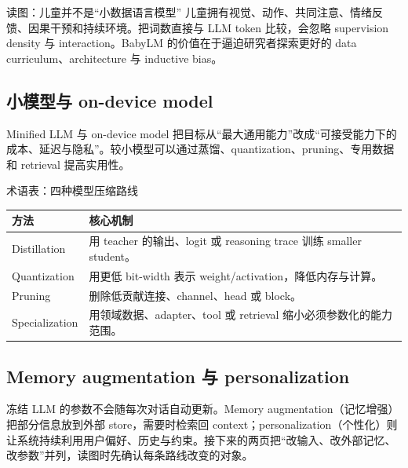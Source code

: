 
\begin{knowledgebox}{读图：儿童并不是“小数据语言模型”}
儿童拥有视觉、动作、共同注意、情绪反馈、因果干预和持续环境。把词数直接与 LLM token 比较，会忽略 supervision density 与 interaction。BabyLM 的价值在于逼迫研究者探索更好的 data curriculum、architecture 与 inductive bias。
\end{knowledgebox}


\subsection{小模型与 on-device model}

Minified LLM 与 on-device model 把目标从“最大通用能力”改成“可接受能力下的成本、延迟与隐私”。较小模型可以通过蒸馏、quantization、pruning、专用数据和 retrieval 提高实用性。


\begin{knowledgebox}{术语表：四种模型压缩路线}
\begin{tabularx}{\textwidth}{L{0.20\textwidth} X}
\toprule
方法 & 核心机制 \\
\midrule
Distillation & 用 teacher 的输出、logit 或 reasoning trace 训练 smaller student。 \\
Quantization & 用更低 bit-width 表示 weight/activation，降低内存与计算。 \\
Pruning & 删除低贡献连接、channel、head 或 block。 \\
Specialization & 用领域数据、adapter、tool 或 retrieval 缩小必须参数化的能力范围。 \\
\bottomrule
\end{tabularx}
\end{knowledgebox}

\subsection{Memory augmentation 与 personalization}

冻结 LLM 的参数不会随每次对话自动更新。Memory augmentation（记忆增强）把部分信息放到外部 store，需要时检索回 context；personalization（个性化）则让系统持续利用用户偏好、历史与约束。接下来的两页把“改输入、改外部记忆、改参数”并列，读图时先确认每条路线改变的对象。

